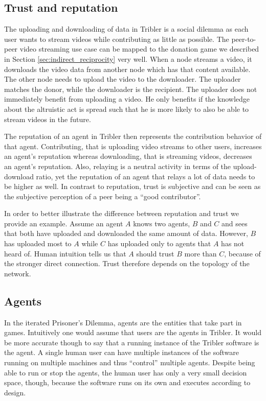 \subsection{Trust and reputation}
The uploading and downloading of data in Tribler is a social dilemma as each user wants to 
stream videos while contributing as little as possible.
The peer-to-peer video streaming use case can be mapped to the donation game we described in 
Section \ref{sec:indirect_reciprocity} very well. When a node streams a video, it downloads the video
data from another node which has that content available. The other node needs to upload the video to
the downloader. The uploader matches the donor, while the downloader is the recipient. The uploader
does not immediately benefit from uploading a video. He only benefits if the knowledge about the 
altruistic act is spread such that he is more likely to also be able to stream videos in the future.

The reputation of an agent in Tribler then represents the 
contribution behavior of that agent. Contributing, that is uploading video streams to other users,
increases an agent's reputation whereas downloading, that is streaming videos, decreases an agent's 
reputation. Also, relaying is a neutral activity in terms of the upload-download ratio, yet the 
reputation of an agent that relays a lot of data needs to be higher as well. In contrast to 
reputation, trust is subjective and can be seen as the subjective perception of a peer being a 
``good contributor''. 

In order to better illustrate the difference between reputation and trust we provide an example.
Assume an agent $A$ knows two agents, $B$ and $C$ and sees that both have uploaded and downloaded 
the same amount of data. However, $B$ has uploaded most to $A$ while $C$ has uploaded only to 
agents that $A$ has not heard of. Human intuition tells us that $A$ should trust $B$ more than $C$, 
because of the stronger direct connection. Trust therefore depends on the topology of the network.

\subsection{Agents}
In the iterated Prisoner's Dilemma, agents are the entities that take part in games. Intuitively one
would assume that users are the agents in Tribler. It would be more accurate though to say that a 
running instance of the Tribler software is the agent. A single human user can have multiple 
instances of the software running on multiple machines and thus ``control'' multiple agents. Despite
being able to run or stop the agents, the human user has only a very small decision space, though, 
because the software runs on its own and executes according to design. 

